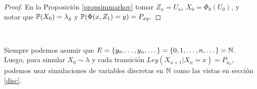\begin{proof}
\gris
En la Proposición \ref{propsimmarkov} tomar $Z_n=U_n$, $X_0=\Phi_0(U_0)$, y notar que $\P(X_0)=\lambda_y$ y $\P(\Phi(x,Z_1)=y)=P_{xy}.$ \findem
\negro
\end{proof}
\vspace{.5cm} \\
\begin{remark}
Siempre podemos asumir que $E=\{y_0,\dots,y_n,\dots\} = \{0,1,\dots,n,\dots\}=\N$.
\newline Luego, para simular $X_0\sim\lambda$ y cada transición $Ley(X_{n+1}|X_n=x)=P_{x_0}$, podemos usar simulaciones de variables discretas en $\N$ como las vistas en sección \ref{disc}.
\end{remark}
\vspace{1.5cm}\\
